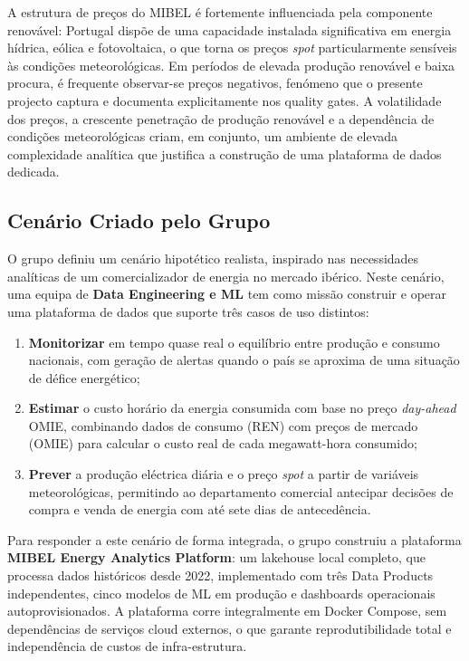 \documentclass[11pt,a4paper]{article}
\begin{document}
A estrutura de preços do MIBEL é fortemente influenciada pela componente renovável: Portugal dispõe de uma capacidade instalada significativa em energia hídrica, eólica e fotovoltaica, o que torna os preços \textit{spot} particularmente sensíveis às condições meteorológicas. Em períodos de elevada produção renovável e baixa procura, é frequente observar-se preços negativos, fenómeno que o presente projecto captura e documenta explicitamente nos quality gates. A volatilidade dos preços, a crescente penetração de produção renovável e a dependência de condições meteorológicas criam, em conjunto, um ambiente de elevada complexidade analítica que justifica a construção de uma plataforma de dados dedicada.

\subsection{Cenário Criado pelo Grupo}

O grupo definiu um cenário hipotético realista, inspirado nas necessidades analíticas de um comercializador de energia no mercado ibérico. Neste cenário, uma equipa de \textbf{Data Engineering e ML} tem como missão construir e operar uma plataforma de dados que suporte três casos de uso distintos:

\begin{enumerate}[leftmargin=*]
  \item \textbf{Monitorizar} em tempo quase real o equilíbrio entre produção e consumo nacionais, com geração de alertas quando o país se aproxima de uma situação de défice energético;
  \item \textbf{Estimar} o custo horário da energia consumida com base no preço \textit{day-ahead} OMIE, combinando dados de consumo (REN) com preços de mercado (OMIE) para calcular o custo real de cada megawatt-hora consumido;
  \item \textbf{Prever} a produção eléctrica diária e o preço \textit{spot} a partir de variáveis meteorológicas, permitindo ao departamento comercial antecipar decisões de compra e venda de energia com até sete dias de antecedência.
\end{enumerate}

Para responder a este cenário de forma integrada, o grupo construiu a plataforma \textbf{MIBEL Energy Analytics Platform}: um lakehouse local completo, que processa dados históricos desde 2022, implementado com três Data Products independentes, cinco modelos de ML em produção e dashboards operacionais autoprovisionados. A plataforma corre integralmente em Docker Compose, sem dependências de serviços cloud externos, o que garante reprodutibilidade total e independência de custos de infra-estrutura.
\end{document}

